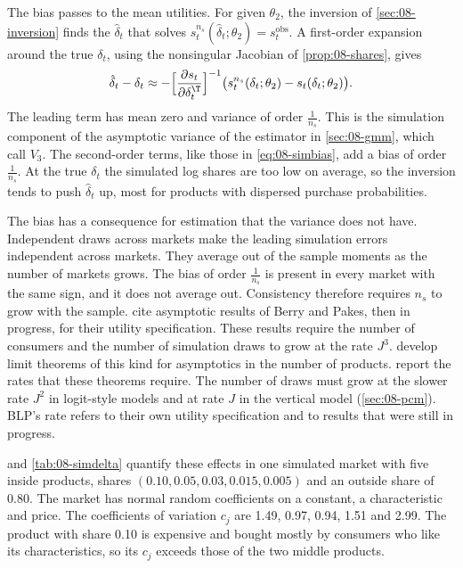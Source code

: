 The bias passes to the mean utilities. For given $\theta_2$, the inversion of \cref{sec:08-inversion} finds the
$\hat\delta_t$ that solves $s^{n_s}_t(\hat\delta_t; \theta_2) = s^{\text{obs}}_t$. A first-order expansion around
the true $\delta_t$, using the nonsingular Jacobian of \cref{prop:08-shares}, gives
\begin{equation}\label{eq:08-delta-error}
  \hat\delta_t - \delta_t \approx -\Bigl[\frac{\partial s_t}{\partial \delta_t^\T}\Bigr]^{-1}
  \bigl(s^{n_s}_t(\delta_t; \theta_2) - s_t(\delta_t; \theta_2)\bigr).
\end{equation}
The leading term has mean zero and variance of order $\frac{1}{n_s}$. This is the simulation component of the
asymptotic variance of the estimator in \cref{sec:08-gmm}, which \citet[p.~859]{BerryLevinsohnPakes1995} call
$V_3$. The second-order terms, like those in \eqref{eq:08-simbias}, add a bias of order $\frac{1}{n_s}$. At the
true $\delta_t$ the simulated log shares are too low on average, so the inversion tends to push $\hat\delta_t$
up, most for products with dispersed purchase probabilities.

The bias has a consequence for estimation that the variance does not have. Independent draws across markets make
the leading simulation errors independent across markets. They average out of the sample moments as the number of
markets grows. The bias of order $\frac{1}{n_s}$ is present in every market with the same sign, and it does not
average out. Consistency therefore requires $n_s$ to grow with the sample. \citet[p.~859]{BerryLevinsohnPakes1995} cite asymptotic
results of Berry and Pakes, then in progress, for their utility specification. These results require the number
of consumers and the number of simulation draws to grow at the rate $J^3$.
\citet{BerryLintonPakes2004} develop limit theorems of this kind for asymptotics in the number of products.
\citet[Section~4.4]{BerryPakes2007} report the rates that these theorems require. The number of draws must grow at
the slower rate $J^2$ in logit-style models and at rate $J$ in the vertical model (\cref{sec:08-pcm}). BLP's
rate refers to their own utility specification and to results that were still in progress.

 and \cref{tab:08-simdelta} quantify these effects in one simulated market with five inside
products, shares $(0.10, 0.05, 0.03, 0.015, 0.005)$ and an outside share of 0.80. The market has normal random
coefficients on a constant, a characteristic and price. The coefficients of variation $c_j$ are 1.49, 0.97, 0.94,
1.51 and 2.99. The product with share 0.10 is expensive and bought mostly by consumers who like its
characteristics, so its $c_j$ exceeds those of the two middle products.

